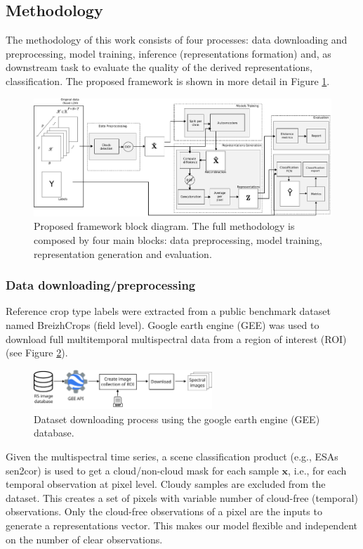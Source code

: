 \documentclass[journal,article,submit,pdftex,moreauthors]{Definitions/mdpi}
\begin{document}
\subsection{Methodology}
The methodology of this work consists of four processes: data downloading and preprocessing, model training, inference (representations formation) and, as downstream task to evaluate the quality of the derived representations, classification. The proposed framework is shown in more detail in Figure \ref{abstract}.
\begin{figure}[H]
	\centering
	\includegraphics[width=\textwidth]{figures/abstract.pdf}
	\caption{Proposed framework block diagram. The full methodology is composed by four main blocks: data preprocessing, model training, representation generation and evaluation.} 
	\label{abstract}
\end{figure}
\subsubsection{Data downloading/preprocessing}\label{data_preprocessing}
Reference crop type labels were extracted from a public benchmark dataset named BreizhCrops \cite{Russwurm2020} (field level).
Google earth engine (GEE) was used to download full multitemporal multispectral data from a region of interest (ROI) (see Figure \ref{GEE_process}). \\
\begin{figure}[H]
	\centering
	\includegraphics[width=0.6\textwidth]{figures/gee_download.pdf}
	\caption{Dataset downloading process using the google earth engine (GEE) database.}
	\label{GEE_process}    
\end{figure}

Given the multispectral time series, a scene classification product (e.g., ESAs sen2cor) is used to get a cloud/non-cloud mask for each sample $\mathbf{x}$, i.e., for each temporal observation at pixel level.
Cloudy samples are excluded from the dataset. This creates a set of pixels with variable number of cloud-free (temporal) observations. Only the cloud-free observations of a pixel are the inputs to generate a representations vector. This makes our model flexible and independent on the number of clear observations.
\end{document}
